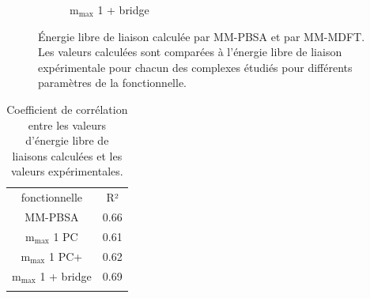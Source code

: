 \begin{figure}[H]
\begin{subfigure}[b]{0.50\textwidth}
        \centering
        \caption{$\mathrm{m}_\mathrm{max}$ 1 + bridge}
     \end{subfigure}
    \caption[Énergie libre de liaison calculée par MM-PBSA et par MM-MDFT.]{Énergie libre de liaison calculée par MM-PBSA et par MM-MDFT. Les valeurs calculées sont comparées à l'énergie libre de liaison expérimentale pour chacun des complexes étudiés pour différents paramètres de la fonctionnelle.}
    \label{fig:MMPBSA_MMMDFT_complete}
\end{figure}





\begin{table}[H]
  \begin{center}
    \begin{tabular}{ c c }
      \hline & \\[-1em]\hline
       fonctionnelle  & R²  \\
      \hline
       MM-PBSA  & 0.66 \\
       $\mathrm{m}_\mathrm{max}$ 1 PC  & 0.61  \\
       $\mathrm{m}_\mathrm{max}$ 1 PC+  & 0.62  \\
       $\mathrm{m}_\mathrm{max}$ 1 + bridge  & 0.69  \\
      \hline & \\[-1em]\hline%
    \end{tabular}
  \end{center}
  \caption{Coefficient de corrélation entre les valeurs d'énergie libre de liaisons calculées et les valeurs expérimentales.}
  \label{tab:MMPBSA_correlation}  
\end{table}




